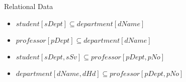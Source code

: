 
\newcommand{\studentDeptInclusionDependency}
{student[sDept] \subseteq department[dName]}
\newcommand{\studentSupervisorInclusionDependency}
{student[sDept,sSv] \subseteq professor[pDept,pNo]}
\newcommand{\professorDeptInclusionDependency}
{professor[pDept] \subseteq department[dName]}
\newcommand{\headOfDeptInclusionDependency}
{department[dName,dHd]  \subseteq professor[pDept,pNo]}

\begin{frame}{Relational Data}

\begin{itemize}
\pause \item $\studentDeptInclusionDependency$ \\
\pause \item $\professorDeptInclusionDependency$      \\
\pause \item $\studentSupervisorInclusionDependency$  \\
\pause \item $\headOfDeptInclusionDependency$         \\
\end{itemize}
\end{frame}
